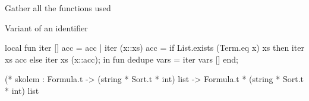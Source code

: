\nwenddocs{}\endmoddef\nwstartdeflinemarkup{}\nwenddeflinemarkup
\LA{}Gather all the functions used~{\nwtagstyle{}}\RA{}

\LA{}Variant of an identifier~{\nwtagstyle{}}\RA{}

local
  fun iter [] acc = acc
    | iter (x::xs) acc = if List.exists (Term.eq x) xs
                         then iter xs acc
                         else iter xs (x::acc);
in
fun dedupe vars = iter vars []
end;

(* skolem : Formula.t ->  (string * Sort.t * int) list ->
     Formula.t * (string * Sort.t * int) list


